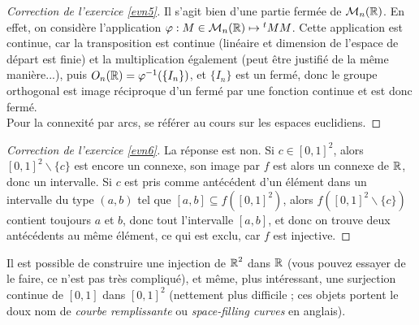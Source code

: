\begin{proof}[Correction de l'exercice \ref{evn5}]
	Il s'agit bien d'une partie fermée de $\mathcal M_n(\operatorname{\mathbb R})$. 
    En effet, on considère l'application $\varphi : M\in\mathcal M_n(\operatorname{\mathbb R})\mapsto {}^tMM$. 
    Cette application est continue, car la transposition est continue (linéaire et dimension de l'espace de départ est finie) 
    et la multiplication également (peut être justifié de la même manière...), puis $O_n(\operatorname{\mathbb R})=\varphi^{-1}(\lbrace I_n\rbrace)$, 
    et $\lbrace I_n\rbrace$ est un fermé, donc le groupe orthogonal est image réciproque d'un fermé par une fonction continue et est donc fermé.\\
	Pour la connexité par arcs, se référer au cours sur les espaces euclidiens.
\end{proof}

\begin{proof}[Correction de l'exercice \ref{evn6}]
    La réponse est non.
    Si $c\in[0,1]^2$, alors $[0,1]^2\backslash\lbrace c\rbrace$ est encore un connexe,
    son image par $f$ est alors un connexe de $\operatorname{\mathbb R}$, donc un intervalle. 
    Si $c$ est pris comme antécédent d'un élément dans un intervalle du type $(a,b)$ tel que $[a,b]\subseteq f([0,1]^2)$,
    alors $f([0,1]^2\backslash\lbrace c\rbrace)$ contient toujours $a$ et $b$, donc tout l'intervalle $[a,b]$, et donc on trouve deux antécédents au même élément,
    ce qui est exclu, car $f$ est injective.
\end{proof}

\begin{remarks}
    Il est possible de construire une injection de $\operatorname{\mathbb R}^2$ dans $\operatorname{\mathbb R}$ (vous pouvez essayer de le faire, ce n'est pas très compliqué),
    et même, plus intéressant, une surjection continue de $[0,1]$ dans $[0,1]^2$ (nettement plus difficile ; 
    ces objets portent le doux nom de \textit{courbe remplissante} ou \textit{space-filling curves} en anglais).
\end{remarks}